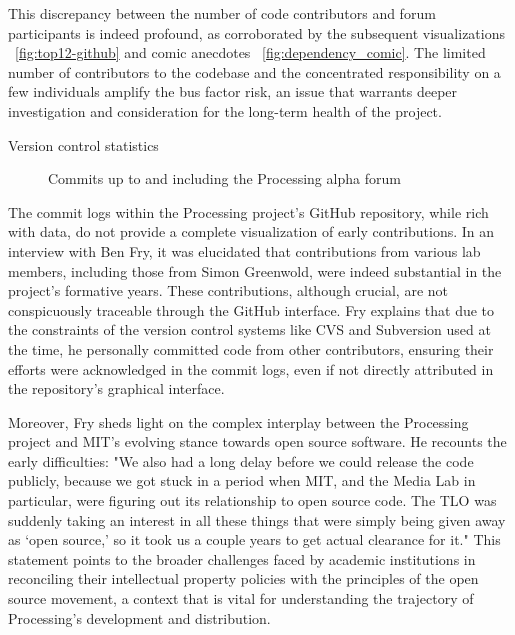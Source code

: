 This discrepancy between the number of code contributors and forum participants is indeed profound, as corroborated by the subsequent visualizations ~\ref{fig:top12-github} and comic anecdotes ~\ref{fig:dependency_comic}. The limited number of contributors to the codebase and the concentrated responsibility on a few individuals amplify the bus factor risk, an issue that warrants deeper investigation and consideration for the long-term health of the project.

\changepapersize{305.3mm:210mm}

{
	\LARGE
	\noindent Version control statistics 
}


\begin{figure}[h!]
	\centering
	
	\caption{Commits up to and including the Processing alpha forum}
	\label{fig:alpha-commits}
\end{figure}



The commit logs within the Processing project's GitHub repository, while rich with data, do not provide a complete visualization of early contributions. In an interview with Ben Fry, it was elucidated that contributions from various lab members, including those from Simon Greenwold, were indeed substantial in the project's formative years. These contributions, although crucial, are not conspicuously traceable through the GitHub interface. Fry explains that due to the constraints of the version control systems like CVS and Subversion used at the time, he personally committed code from other contributors, ensuring their efforts were acknowledged in the commit logs, even if not directly attributed in the repository's graphical interface.

Moreover, Fry sheds light on the complex interplay between the Processing project and MIT's evolving stance towards open source software. He recounts the early difficulties: "We also had a long delay before we could release the code publicly, because we got stuck in a period when MIT, and the Media Lab in particular, were figuring out its relationship to open source code. The TLO was suddenly taking an interest in all these things that were simply being given away as ‘open source,’ so it took us a couple years to get actual clearance for it." This statement points to the broader challenges faced by academic institutions in reconciling their intellectual property policies with the principles of the open source movement, a context that is vital for understanding the trajectory of Processing's development and distribution.

